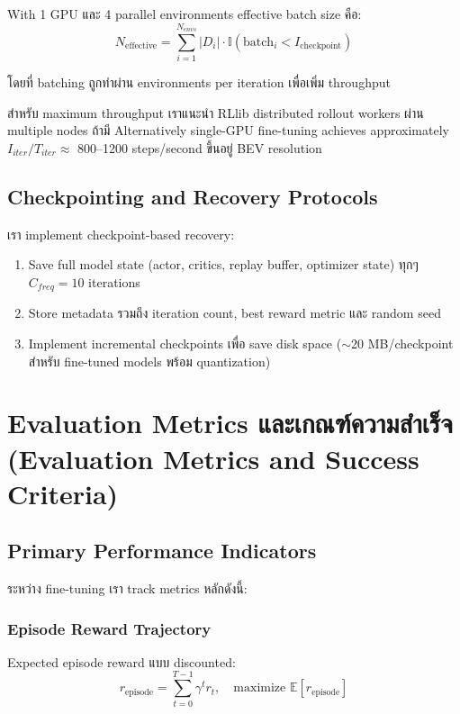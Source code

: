 \documentclass[10pt,a4paper,twocolumn]{article}
\begin{document}
With 1 GPU และ 4 parallel environments effective batch size คือ:
\begin{equation}\label{eq:effective-batch-size}
    N_{\text{effective}} = \sum_{i=1}^{N_{envs}} |D_i| \cdot \mathbb{I}(\text{batch}_i < I_{\text{checkpoint}})
\end{equation}

โดยที่ batching ถูกทำผ่าน environments per iteration เพื่อเพิ่ม throughput

สำหรับ maximum throughput เราแนะนำ RLlib distributed rollout workers ผ่าน multiple nodes ถ้ามี Alternatively single-GPU fine-tuning achieves approximately $I_{iter}/T_{iter} \approx$ 800--1200 steps/second ขึ้นอยู่ BEV resolution

\subsection{Checkpointing and Recovery Protocols}

เรา implement checkpoint-based recovery:
\begin{enumerate}
    \item Save full model state (actor, critics, replay buffer, optimizer state) ทุกๆ $C_{freq}=10$ iterations
    
    \item Store metadata รวมถึง iteration count, best reward metric และ random seed
    
    \item Implement incremental checkpoints เพื่อ save disk space ($\sim$20 MB/checkpoint สำหรับ fine-tuned models พร้อม quantization)
\end{enumerate}

\section{Evaluation Metrics และเกณฑ์ความสำเร็จ (Evaluation Metrics and Success Criteria)}

\subsection{Primary Performance Indicators}

ระหว่าง fine-tuning เรา track metrics หลักดังนี้:

\subsubsection{Episode Reward Trajectory}
Expected episode reward แบบ discounted:
\begin{equation}\label{eq:episode-reward}
    r_{\text{episode}} = \sum_{t=0}^{T-1} \gamma^t r_t, \quad \text{maximize } \mathbb{E}[r_{\text{episode}}]
\end{equation}
\end{document}
